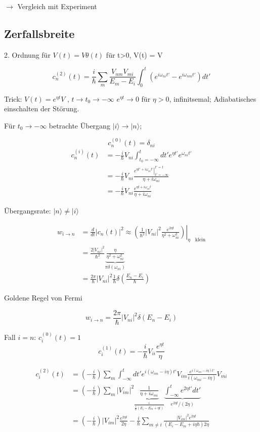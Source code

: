 \(\rightarrow \) Vergleich mit Experiment


\subsection{Zerfallsbreite}

2. Ordnung für \(V(t)=V\theta(t)\) für t>0, V(t) = V

\[c^{(2)}_n(t) = \frac{i}{\hbar}\sum_m\frac{V_{nm}V_{mi}}{E_m-E_i}\int_0^t (e^{i\omega_{ni}t'}-e^{i\omega_{nm}t'})dt'\]

Trick: \(V(t) = e^{\eta t}V\) , \(t\rightarrow t_0\rightarrow -\infty\) \( e^{\eta t}\rightarrow 0\) für \(\eta>0\), infinitsemal; Adiabatisches einschalten der Störung.

Für \(t_0\rightarrow -\infty\) betrachte Übergang \(|i\rangle \rightarrow |n\rangle \);

\[c^{(0)}_n(t) = \delta_{ni}\]
\begin{align}
  c^{(i)}_n(t) &=  -\frac{i}{\hbar}V_{ni}\int_{t_0=-\infty}^t dt' e^{\eta t'}e^{\omega_{ni}t'}\\
  &= -\frac{i}{\hbar}V_{ni}\frac{\left.e^{\eta t'+i\omega_{ni}t'}\right|^{t'=t}_{t'=-\infty}}{\eta+i\omega_{ni}}\\
  &= -\frac{i}{\hbar}V_{ni}\frac{e^{\eta t+i\omega_{ni}t}}{\eta+i\omega_{ni}}
\end{align}

Übergangsrate: \(|n\rangle \neq |i\rangle \)

\begin{align}
  w_{i\rightarrow n} &= \frac{d}{dt} | c_n(t)|^2 \approx\left.\left(\frac{1}{\hbar^2}|V_{ni}|^2\frac{e^{2\eta t}}{\eta^2+\omega_{ni}^2}\right)\right|_{\eta \quad\text{klein}}\\
  &= \frac{2|V_{ni}|^2}{\hbar^2}\underbrace{\frac{\eta}{\eta^2+\omega_{ni}^2}}_{\pi\delta(\omega_{ni})}\\
  &=\frac{2\pi}{\hbar}|V_{ni}|^2 \frac{1}{\hbar}\delta\left(\frac{E_n-E_i}{\hbar}\right)
\end{align}

Goldene Regel von Fermi

\[w_{i\rightarrow n} = \frac{2\pi}{\hbar} |V_{ni}|^2 \delta(E_n-E_i)\]

Fall \(i=n\): \(c^{(0)}_i(t) = 1\)
\[c^{(1)}_i(t) = -\frac{i}{\hbar}V_{ii}\frac{e^{\eta t}}{\eta}\]

\begin{align}
  c^{(2)}_i(t) &= \left(-\frac{i}{\hbar}\right)\sum_m\int_{-\infty}^t dt'e^{i(\omega_{im}-i\eta)t'} V_{im} \frac{e^{i(\omega_{im}-i\eta)t'}}{i(\omega_{mi}-i\eta)}V_{mi} \\
  &=\left(-\frac{i}{\hbar}\right)\sum_m |V_{im}|^2\underbrace{\frac{1}{\eta+i\omega_{mi}}}_{\frac{i}{\frac{i}{\hbar}(E_i-E_m+\eta t)}}\underbrace{\int_{-\infty}^t e^{2\eta t'}dt'}_{e^{2\eta t}/(2\eta)}\\
  &= \left(-\frac{i}{\hbar}\right)|V_{im}|^2 \frac{e^{2\eta t}}{2\eta} -\frac{i}{\hbar}\sum_{m\neq i}\frac{|V_{im}|^2e^{2\eta t}}{(E_i-E_m+i\eta\hbar)2\eta}
\end{align}



